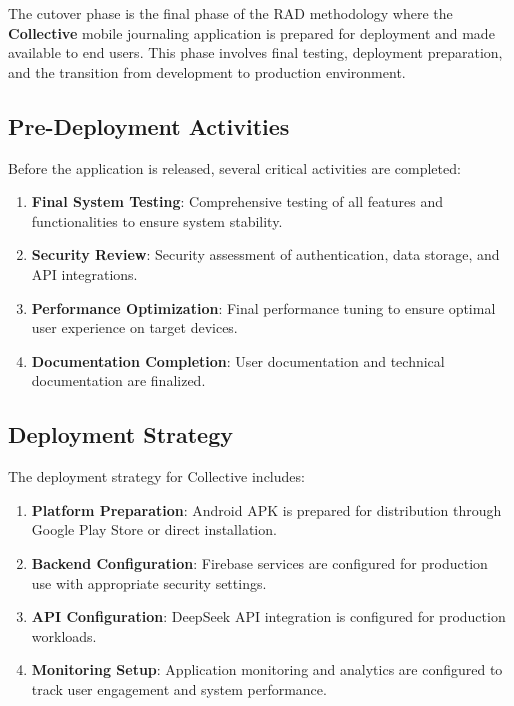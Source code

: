 The cutover phase is the final phase of the RAD methodology where the \textbf{Collective} mobile journaling application is prepared for deployment and made available to end users. This phase involves final testing, deployment preparation, and the transition from development to production environment.

\subsection{Pre-Deployment Activities}\label{subsec:preDeployment}

Before the application is released, several critical activities are completed:

\begin{enumerate}
    \item \textbf{Final System Testing}: Comprehensive testing of all features and functionalities to ensure system stability.
    
    \item \textbf{Security Review}: Security assessment of authentication, data storage, and API integrations.
    
    \item \textbf{Performance Optimization}: Final performance tuning to ensure optimal user experience on target devices.
    
    \item \textbf{Documentation Completion}: User documentation and technical documentation are finalized.
\end{enumerate}

\subsection{Deployment Strategy}\label{subsec:deploymentStrategy}

The deployment strategy for Collective includes:

\begin{enumerate}
    \item \textbf{Platform Preparation}: Android APK is prepared for distribution through Google Play Store or direct installation.
    
    \item \textbf{Backend Configuration}: Firebase services are configured for production use with appropriate security settings.
    
    \item \textbf{API Configuration}: DeepSeek API integration is configured for production workloads.
    
    \item \textbf{Monitoring Setup}: Application monitoring and analytics are configured to track user engagement and system performance.
\end{enumerate}

